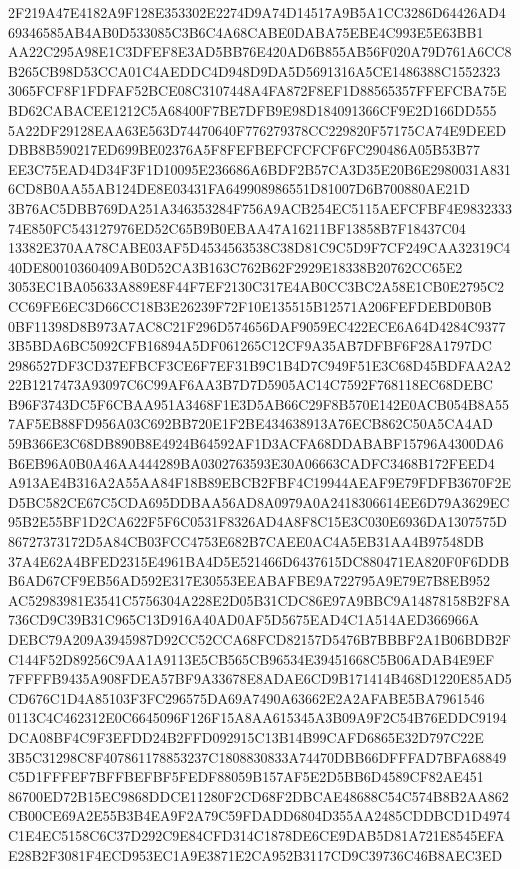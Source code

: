 \documentclass[UTF8,fontset=fandol,zihao=-4,a4paper]{ctexart}
\begin{document}
{{2F219A47E4182A9F128E353302E2274D9A74D14517A9B5A1CC3286D64426AD469346585AB4AB0D533085C3B6C4A68CABE0DABA75EBE4C993E5E63BB1
AA22C295A98E1C3DFEF8E3AD5BB76E420AD6B855AB56F020A79D761A6CC8B265CB98D53CCA01C4AEDDC4D948D9DA5D5691316A5CE1486388C1552323
3065FCF8F1FDFAF52BCE08C3107448A4FA872F8EF1D88565357FFEFCBA75EBD62CABACEE1212C5A68400F7BE7DFB9E98D184091366CF9E2D166DD555
5A22DF29128EAA63E563D74470640F776279378CC229820F57175CA74E9DEEDDBB8B590217ED699BE02376A5F8FEFBEFCFCFCF6FC290486A05B53B77
EE3C75EAD4D34F3F1D10095E236686A6BDF2B57CA3D35E20B6E2980031A8316CD8B0AA55AB124DE8E03431FA649908986551D81007D6B700880AE21D
3B76AC5DBB769DA251A346353284F756A9ACB254EC5115AEFCFBF4E983233374E850FC543127976ED52C65B9B0EBAA47A16211BF13858B7F18437C04
13382E370AA78CABE03AF5D4534563538C38D81C9C5D9F7CF249CAA32319C440DE80010360409AB0D52CA3B163C762B62F2929E18338B20762CC65E2
3053EC1BA05633A889E8F44F7EF2130C317E4AB0CC3BC2A58E1CB0E2795C2CC69FE6EC3D66CC18B3E26239F72F10E135515B12571A206FEFDEBD0B0B
0BF11398D8B973A7AC8C21F296D574656DAF9059EC422ECE6A64D4284C93773B5BDA6BC5092CFB16894A5DF061265C12CF9A35AB7DFBF6F28A1797DC
2986527DF3CD37EFBCF3CE6F7EF31B9C1B4D7C949F51E3C68D45BDFAA2A222B1217473A93097C6C99AF6AA3B7D7D5905AC14C7592F768118EC68DEBC
B96F3743DC5F6CBAA951A3468F1E3D5AB66C29F8B570E142E0ACB054B8A557AF5EB88FD956A03C692BB720E1F2BE434638913A76ECB862C50A5CA4AD
59B366E3C68DB890B8E4924B64592AF1D3ACFA68DDABABF15796A4300DA6B6EB96A0B0A46AA444289BA0302763593E30A06663CADFC3468B172FEED4
A913AE4B316A2A55AA84F18B89EBCB2FBF4C19944AEAF9E79FDFB3670F2ED5BC582CE67C5CDA695DDBAA56AD8A0979A0A2418306614EE6D79A3629EC
95B2E55BF1D2CA622F5F6C0531F8326AD4A8F8C15E3C030E6936DA1307575D86727373172D5A84CB03FCC4753E682B7CAEE0AC4A5EB31AA4B97548DB
37A4E62A4BFED2315E4961BA4D5E521466D6437615DC880471EA820F0F6DDBB6AD67CF9EB56AD592E317E30553EEABAFBE9A722795A9E79E7B8EB952
AC52983981E3541C5756304A228E2D05B31CDC86E97A9BBC9A14878158B2F8A736CD9C39B31C965C13D916A40AD0AF5D5675EAD4C1A514AED366966A
DEBC79A209A3945987D92CC52CCA68FCD82157D5476B7BBBF2A1B06BDB2FC144F52D89256C9AA1A9113E5CB565CB96534E39451668C5B06ADAB4E9EF
7FFFFB9435A908FDEA57BF9A33678E8ADAE6CD9B171414B468D1220E85AD5CD676C1D4A85103F3FC296575DA69A7490A63662E2A2AFABE5BA7961546
0113C4C462312E0C6645096F126F15A8AA615345A3B09A9F2C54B76EDDC9194DCA08BF4C9F3EFDD24B2FFD092915C13B14B99CAFD6865E32D797C22E
3B5C31298C8F407861178853237C1808830833A74470DBB66DFFFAD7BFA68849C5D1FFFEF7BFFBEFBF5FEDF88059B157AF5E2D5BB6D4589CF82AE451
86700ED72B15EC9868DDCE11280F2CD68F2DBCAE48688C54C574B8B2AA862CB00CE69A2E55B3B4EA9F2A79C59FDADD6804D355AA2485CDDBCD1D4974
C1E4EC5158C6C37D292C9E84CFD314C1878DE6CE9DAB5D81A721E8545EFAE28B2F3081F4ECD953EC1A9E3871E2CA952B3117CD9C39736C46B8AEC3ED
}}
\end{document}
